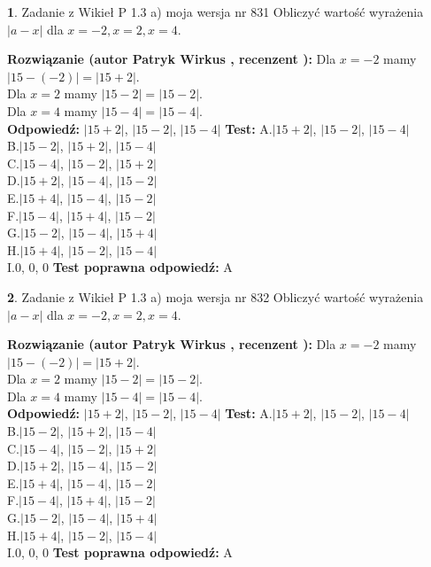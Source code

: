 \documentclass[12pt, a4paper]{article}
\theoremstyle{definition} %
\newtheorem{zad}{}
\newcommand{\zadStart}[1]{\begin{zad}#1\newline}
\newcommand{\zadStop}{\end{zad}}
\newcommand{\rozwStart}[2]{\noindent \textbf{Rozwiązanie (autor #1 , recenzent #2): }\newline}
\newcommand{\rozwStop}{\newline}
\newcommand{\odpStart}{\noindent \textbf{Odpowiedź:}\newline}
\newcommand{\odpStop}{\newline}
\newcommand{\testStart}{\noindent \textbf{Test:}\newline}
\newcommand{\testStop}{\newline}
\newcommand{\kluczStart}{\noindent \textbf{Test poprawna odpowiedź:}\newline}
\newcommand{\kluczStop}{\newline}
\begin{document}
\zadStart{Zadanie z Wikieł P 1.3 a) moja wersja nr 831}
Obliczyć wartość wyrażenia $|a - x|$ dla $x=-2,x=2,x=4$.
\zadStop
\rozwStart{Patryk Wirkus}{}
Dla $x = -2$ mamy $|15 - (-2)| = |15 + 2|$.\\
Dla $x = 2$ mamy $|15 - 2| = |15 - 2|$.\\
Dla $x = 4$ mamy $|15 - 4| = |15 - 4|$.\\
\rozwStop
\odpStart
$|15 + 2|$, $|15 - 2|$, $|15 - 4|$
\odpStop
\testStart
A.$|15 + 2|$, $|15 - 2|$, $|15 - 4|$\\
B.$|15 - 2|$, $|15 + 2|$, $|15 - 4|$\\
C.$|15 - 4|$, $|15 - 2|$, $|15 + 2|$\\
D.$|15 + 2|$, $|15 - 4|$, $|15 - 2|$\\
E.$|15 + 4|$, $|15 - 4|$, $|15 - 2|$\\
F.$|15 - 4|$, $|15 + 4|$, $|15 - 2|$\\
G.$|15 - 2|$, $|15 - 4|$, $|15 + 4|$\\
H.$|15 + 4|$, $|15 - 2|$, $|15 - 4|$\\
I.$0$, $0$, $0$
\testStop
\kluczStart
A
\kluczStop



\zadStart{Zadanie z Wikieł P 1.3 a) moja wersja nr 832}
Obliczyć wartość wyrażenia $|a - x|$ dla $x=-2,x=2,x=4$.
\zadStop
\rozwStart{Patryk Wirkus}{}
Dla $x = -2$ mamy $|15 - (-2)| = |15 + 2|$.\\
Dla $x = 2$ mamy $|15 - 2| = |15 - 2|$.\\
Dla $x = 4$ mamy $|15 - 4| = |15 - 4|$.\\
\rozwStop
\odpStart
$|15 + 2|$, $|15 - 2|$, $|15 - 4|$
\odpStop
\testStart
A.$|15 + 2|$, $|15 - 2|$, $|15 - 4|$\\
B.$|15 - 2|$, $|15 + 2|$, $|15 - 4|$\\
C.$|15 - 4|$, $|15 - 2|$, $|15 + 2|$\\
D.$|15 + 2|$, $|15 - 4|$, $|15 - 2|$\\
E.$|15 + 4|$, $|15 - 4|$, $|15 - 2|$\\
F.$|15 - 4|$, $|15 + 4|$, $|15 - 2|$\\
G.$|15 - 2|$, $|15 - 4|$, $|15 + 4|$\\
H.$|15 + 4|$, $|15 - 2|$, $|15 - 4|$\\
I.$0$, $0$, $0$
\testStop
\kluczStart
A
\kluczStop
\end{document}
